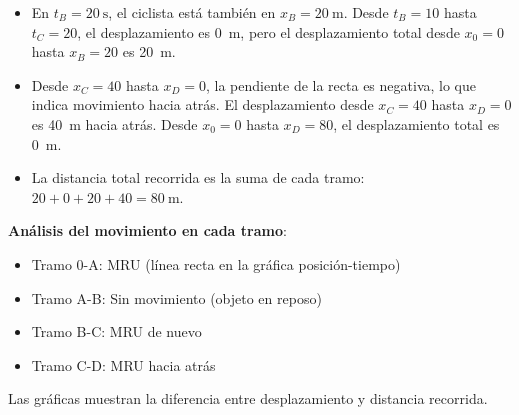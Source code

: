 \vspace*{-6pt}
\begin{itemize}[leftmargin=0pt]
        \item En \( t_B=\qty{20}{\s} \), el ciclista está también en \( x_B = \qty{20}{\metre} \).
        Desde \( t_B=10 \) hasta \( t_C=20 \), el desplazamiento es \qty{0}{\m}, pero el desplazamiento total desde \( x_0 = 0 \) hasta \( x_B = 20 \) es \qty{20}{\m}.
        \item Desde \( x_C = 40 \) hasta \( x_D=0 \), la pendiente de la recta es negativa, lo que indica movimiento hacia atrás.
        El desplazamiento desde \( x_C = 40 \) hasta \( x_D = 0 \) es \qty{40}{\m} hacia atrás.
        Desde \( x_0 = 0 \) hasta \( x_D=80 \), el desplazamiento total es \qty{0}{\m}.
        \item La distancia total recorrida es la suma de cada tramo: \( 20 + 0 + 20 + 40 = \qty{80}{\m} \).
\end{itemize}

\textbf{Análisis del movimiento en cada tramo}:
\begin{itemize}
    \item Tramo 0-A: MRU (línea recta en la gráfica posición-tiempo)
    \item Tramo A-B: Sin movimiento (objeto en reposo)
    \item Tramo B-C: MRU de nuevo
    \item Tramo C-D: MRU hacia atrás
\end{itemize}
Las gráficas muestran la diferencia entre desplazamiento y distancia recorrida.

